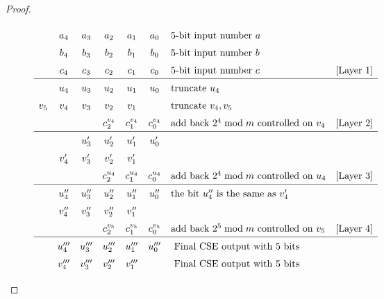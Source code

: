 \begin{proof}
\begin{center}
\begin{figure}[h!tb]
\begin{displaymath}
\renewcommand\arraystretch{1.5}
\begin{array}{ccccccll}
        & a_4 & a_3 & a_2 & a_1 & a_0 & 5\text{-bit input number } a &\\
        & b_4 & b_3 & b_2 & b_1 & b_0 & 5\text{-bit input number } b & \\
        & c_4 & c_3 & c_2 & c_1 & c_0 & 5\text{-bit input number } c & \text{[Layer 1]}\\
\hline
        & u_4 & u_3 & u_2 & u_1 & u_0 & \text{truncate } u_{4} & \\
    v_5 & v_4 & v_3 & v_2 & v_1 &     & \text{truncate } v_{4},v_{5} & \\
        &     &     & c^{v_4}_2 & c^{v_4}_1 & c^{v_4}_0 & \text{add back } 2^4 \bmod m \text{ controlled on } v_4 & \text{[Layer 2]}\\
\hline
        &      & u'_3 & u'_2 & u'_1 & u'_0 & & \\
        & v'_4 & v'_3 & v'_2 & v'_1 &      & & \\
        &      &    & c^{u_4}_2 & c^{u_4}_1 & c^{u_4}_0  & \text{add back } 2^4 \bmod m \text{ controlled on } u_4 & \text{[Layer 3]}\\
\hline
        & u''_4 & u''_3 & u''_2 & u''_1 & u''_0 & \text{the bit } u''_4 \text{ is the same as } v'_4 & \\
        & v''_4 & v''_3 & v''_2 & v''_1 &       &  & \\
        &       &    & c^{v_5}_2 & c^{v_5}_1 & c^{v_5}_0 & \text{add back } 2^5 \bmod m \text{ controlled on } v_5 & \text{[Layer 4]}\\
\hline
        & u'''_4 & u'''_3 & u'''_2 & u'''_1 & u'''_0 & \text{ Final CSE output with } 5 \text{ bits} &\\
        & v'''_4 & v'''_3 & v'''_2 & v'''_1 &        & \text{ Final CSE output with } 5 \text{ bits} & \\
\end{array}

\end{displaymath}
\end{figure}
\end{center}
\end{proof}
